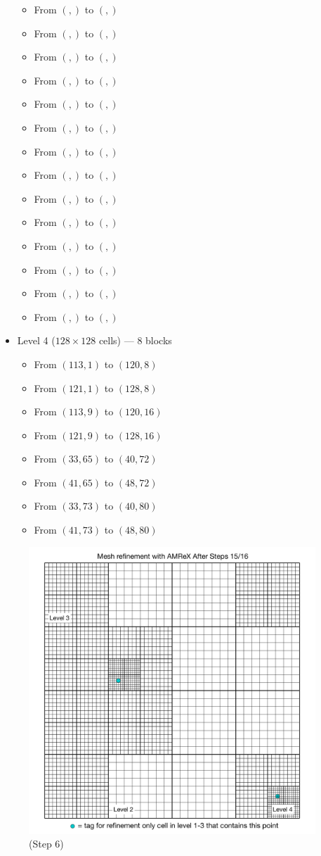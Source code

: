 \documentclass[12pt,letterpaper]{article}
\begin{document}
\begin{itemize}
\begin{itemize}
    \item{From $(,)$ to $(,)$}
    \item{From $(,)$ to $(,)$}
    \item{From $(,)$ to $(,)$}
    \item{From $(,)$ to $(,)$}
    \item{From $(,)$ to $(,)$}
    \item{From $(,)$ to $(,)$}
    \item{From $(,)$ to $(,)$}
    \item{From $(,)$ to $(,)$}
    \item{From $(,)$ to $(,)$}
    \item{From $(,)$ to $(,)$}
    \item{From $(,)$ to $(,)$}
    \item{From $(,)$ to $(,)$}
    \item{From $(,)$ to $(,)$}
    \item{From $(,)$ to $(,)$}
    \end{itemize}
\item{Level 4 ($128 \times 128$ cells) --- 8 blocks}
    \begin{itemize}
    \item{From $(113,1)$ to $(120, 8)$}
    \item{From $(121,1)$ to $(128, 8)$}
    \item{From $(113,9)$ to $(120,16)$}
    \item{From $(121,9)$ to $(128,16)$}
    \item{From $(33,65)$ to $(40,72)$}
    \item{From $(41,65)$ to $(48,72)$}
    \item{From $(33,73)$ to $(40,80)$}
    \item{From $(41,73)$ to $(48,80)$}
    \end{itemize}
\end{itemize}

\begin{figure}[!hp]
\begin{center}
\includegraphics[width=4.25in]{TestRefine_Step16_Both.pdf}
\caption{(Step 6) }
\end{center}
\end{figure}
\end{document}
